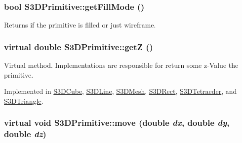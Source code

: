 \hypertarget{class_s3_d_primitive_a36948fee7526b4c0634d16372ebb3e56}{
\subsubsection[{getFillMode}]{\setlength{\rightskip}{0pt plus 5cm}bool S3DPrimitive::getFillMode ()}}
\label{class_s3_d_primitive_a36948fee7526b4c0634d16372ebb3e56}


Returns if the primitive is filled or just wireframe. 

\hypertarget{class_s3_d_primitive_ab5b06d3a8e83216cc42554bb78afd2d9}{
\subsubsection[{getZ}]{\setlength{\rightskip}{0pt plus 5cm}virtual double S3DPrimitive::getZ ()}}
\label{class_s3_d_primitive_ab5b06d3a8e83216cc42554bb78afd2d9}


Virtual method. Implementations are responsible for return some z-\/Value the primitive. 



Implemented in \hyperlink{class_s3_d_cube_a4ac1d080b330d6b69d24097f746ddd4c}{S3DCube}, \hyperlink{class_s3_d_line_a72aabdbb4d3d0c3ea36f5fda7b059f6a}{S3DLine}, \hyperlink{class_s3_d_mesh_aa11c4dd0ce01443c07afaabc0e206881}{S3DMesh}, \hyperlink{class_s3_d_rect_a7b3fb925a55d8a22a354829d6a5afa3d}{S3DRect}, \hyperlink{class_s3_d_tetraeder_a5f77481efa810aafb63e9d1d5c14ceea}{S3DTetraeder}, and \hyperlink{class_s3_d_triangle_a35428b5799c8d51a6c57d1fdb5b575a1}{S3DTriangle}.

\hypertarget{class_s3_d_primitive_a73a178ec2e1aa8e95f01baf0552724a9}{
\subsubsection[{move}]{\setlength{\rightskip}{0pt plus 5cm}virtual void S3DPrimitive::move (double {\em dx}, \/  double {\em dy}, \/  double {\em dz})}}
\label{class_s3_d_primitive_a73a178ec2e1aa8e95f01baf0552724a9}


